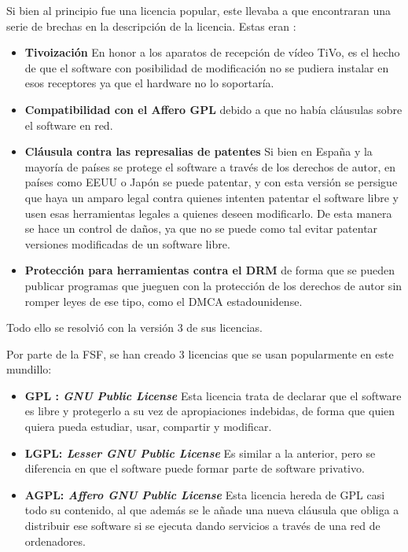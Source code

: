 Si bien al principio fue una licencia popular, este llevaba a que encontraran una serie de brechas en la descripción de la licencia. Estas eran \cite{gplv3-changelog}:
\begin{itemize}
	\item \textbf{Tivoización} En honor a los aparatos de recepción de vídeo TiVo, es el hecho de que el software con posibilidad de modificación no se pudiera instalar en esos receptores ya que el hardware no lo soportaría.
	
	\item \textbf{Compatibilidad con el Affero GPL} debido a que no había cláusulas sobre el software en red.
	
	\item \textbf{Cláusula contra las represalias de patentes} Si bien en España y la mayoría de países se protege el software a través de los derechos de autor, en países como EEUU o Japón se puede patentar, y con esta versión se persigue que haya un amparo legal contra quienes intenten patentar el software libre y usen esas herramientas legales a quienes deseen modificarlo. De esta manera se hace un control de daños, ya que no se puede como tal evitar patentar versiones modificadas de un software libre.
	
	\item \textbf{Protección para herramientas contra el DRM} de forma que se pueden publicar programas que jueguen con la protección de los derechos de autor sin romper leyes de ese tipo, como el DMCA estadounidense.
	
\end{itemize} 

Todo ello se resolvió con la versión 3 de sus licencias. \cite{gplv3-changelog}

Por parte de la FSF, se han creado 3 licencias que se usan popularmente en este mundillo:

\begin{itemize}
	\item \textbf{GPL : \textit{GNU Public License}} Esta licencia trata de declarar que el software es libre y protegerlo a su vez de apropiaciones indebidas, de forma que quien quiera pueda estudiar, usar, compartir y modificar. 
	\item \textbf{LGPL: \textit{Lesser GNU Public License}} Es similar a la anterior, pero se diferencia en que el software puede formar parte de software privativo.
	\item \textbf{AGPL: \textit{Affero GNU Public License}} Esta licencia hereda de GPL casi todo su contenido, al que además se le añade una nueva cláusula que obliga a distribuir ese software si se ejecuta dando servicios a través de una red de ordenadores.
\end{itemize}

